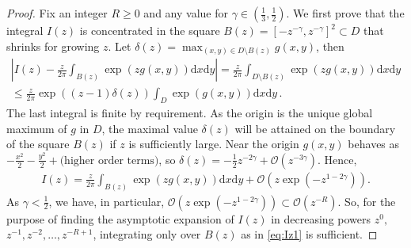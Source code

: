 \documentclass[english]{ourlematemasingle}
\numberwithin{theorem}{section}
\theoremstyle{remark}
\newcommand{\bigO}{\mathcal{O}}
\renewcommand{\d}{\mathrm{d}}
\begin{document}
\begin{proof}
Fix an integer $R \geq 0$ and any value for $\gamma \in \left(\frac13,\frac12\right)$.
We first prove that the integral $I(z)$ is concentrated in the square $B(z) = [-z^{-\gamma},z^{-\gamma}]^2 \subset D$ that shrinks for growing $z$.
Let $\delta(z) = \max_{(x,y) \in D \setminus B(z)} g(x,y)$, then
    \begin{gather*}
    \left\vert I(z) - \frac{z}{2\pi} \int_{B(z)} \exp(z g(x,y)) \d x \d y \right\vert 
    = \frac{z}{2\pi} \int_{D\setminus B(z)} \exp(z g(x,y)) \d x \d y \\
    \leq \frac{z}{2\pi} \exp\left((z-1) \delta(z)\right) \int_{D} \exp(g(x,y)) \d x \d y \,.
    \end{gather*}
The last integral is finite by requirement.
As the origin is the unique global maximum of $g$ in $D$,
the maximal value $\delta(z)$ will be attained on the boundary of the square
$B(z)$ if $z$ is sufficiently large. Near the origin $g(x,y)$ behaves as \hbox{$-\frac{x^2}{2}-\frac{y^2}{2} +\textrm{(higher order terms)}$}, so $\delta(z)= -\frac{1}{2}z^{-2\gamma} + \bigO(z^{-3\gamma})$. Hence,  
    \begin{gather}
    \label{eq:Iz1}
    I(z) =  \frac{z}{2\pi} \int_{B(z)} \exp(z g(x,y)) \d x \d y  + \bigO(z \exp( -z^{1-2\gamma})).
    \end{gather}
As $\gamma < \frac12$, we have, in particular, $\bigO(z \exp( -z^{1-2\gamma})) \subset \bigO(z^{-R})$.
So, for the purpose of finding the asymptotic expansion of $I(z)$ in decreasing powers $z^{0},$ $z^{-1}, z^{-2},\ldots,z^{-R+1}$, integrating only over $B(z)$ as in \eqref{eq:Iz1} is sufficient.


\end{proof}
\end{document}
